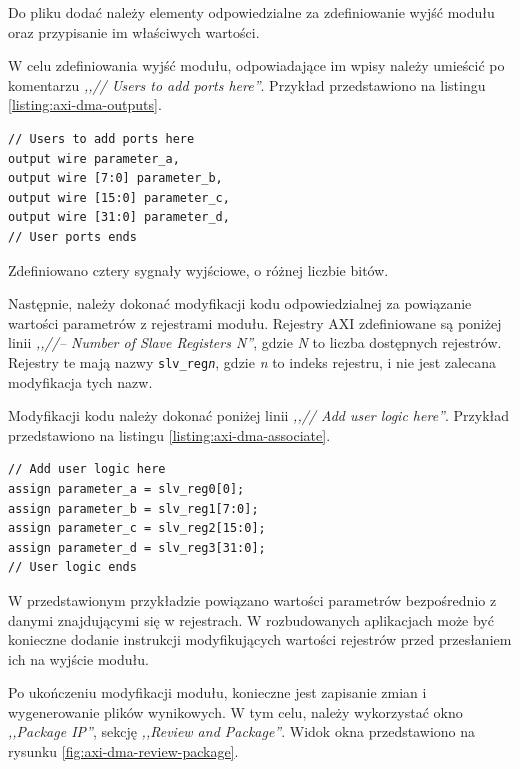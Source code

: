 Do pliku dodać należy elementy odpowiedzialne za zdefiniowanie wyjść modułu oraz przypisanie im właściwych wartości.

W celu zdefiniowania wyjść modułu, odpowiadające im wpisy należy umieścić po komentarzu \emph{,,// Users to add ports here''}. Przykład przedstawiono na listingu \ref{listing:axi-dma-outputs}.

\begin{lstlisting}[breaklines, label=listing:axi-dma-outputs, caption=Definicja interfejsów wyjściowych modułu.]
// Users to add ports here
output wire parameter_a,
output wire [7:0] parameter_b,
output wire [15:0] parameter_c,
output wire [31:0] parameter_d,
// User ports ends
\end{lstlisting}

Zdefiniowano cztery sygnały wyjściowe, o różnej liczbie bitów.

Następnie, należy dokonać modyfikacji kodu odpowiedzialnej za powiązanie wartości parametrów z rejestrami modułu. Rejestry AXI zdefiniowane są poniżej linii \emph{,,//-- Number of Slave Registers N''}, gdzie \emph{N} to liczba dostępnych rejestrów. Rejestry te mają nazwy \texttt{slv\_reg\emph{n}}, gdzie \emph{n} to indeks rejestru, i nie jest zalecana modyfikacja tych nazw.

Modyfikacji kodu należy dokonać poniżej linii \emph{,,// Add user logic here''}. Przykład przedstawiono na listingu \ref{listing:axi-dma-associate}.

\begin{lstlisting}[breaklines, label=listing:axi-dma-associate, caption=Powiązanie wyjść z rejestrami modułu.]
// Add user logic here
assign parameter_a = slv_reg0[0];
assign parameter_b = slv_reg1[7:0];
assign parameter_c = slv_reg2[15:0];
assign parameter_d = slv_reg3[31:0];
// User logic ends
\end{lstlisting}

W przedstawionym przykładzie powiązano wartości parametrów bezpośrednio z danymi znajdującymi się w rejestrach. W rozbudowanych aplikacjach może być konieczne dodanie instrukcji modyfikujących wartości rejestrów przed przesłaniem ich na wyjście modułu.

Po ukończeniu modyfikacji modułu, konieczne jest zapisanie zmian i wygenerowanie plików wynikowych. W tym celu, należy wykorzystać okno \emph{,,Package IP''}, sekcję \emph{,,Review and Package''}. Widok okna przedstawiono na rysunku \ref{fig:axi-dma-review-package}.

